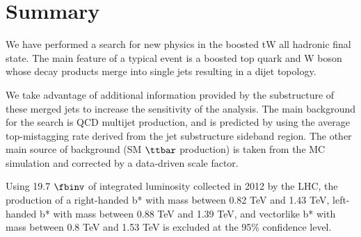 \clearpage
\newpage
\chapter{Summary}
\label{sec:bssummary}
We have performed a search for new physics in the boosted tW all
hadronic final state.  The main feature of a typical event is a boosted top quark and W boson
whose decay products merge into single jets resulting in a dijet topology. 

We take advantage of additional information provided by the 
substructure of these merged jets  to increase the sensitivity of the analysis.  The main background for
the search is QCD multijet production, and is predicted by using the
average top-mistagging rate derived from the jet substructure sideband
region.  The other main source of background (SM $\ttbar$ production) is taken from 
the MC simulation and corrected by a data-driven scale factor.

Using 19.7$~\fbinv$ of integrated luminosity collected in 2012 by the
LHC, the production of a right-handed b* with mass between 0.82 TeV and 1.43 TeV, 
left-handed b* with mass between 0.88 TeV and 1.39 TeV, 
and vectorlike b* with mass between 0.8 TeV and 1.53 TeV is excluded at the 95\% confidence level.
